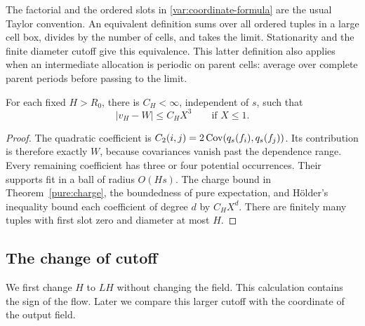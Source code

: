 The factorial and the ordered slots in
\eqref{var:coordinate-formula} are the usual Taylor convention.  An
equivalent definition sums over all ordered tuples in a large cell box,
divides by the number of cells, and takes the limit.  Stationarity and
the finite diameter cutoff give this equivalence.  This latter definition
also applies when an intermediate allocation is periodic on parent
cells: average over complete parent periods before passing to the limit.

\begin{lemma}\label{var:near-W}
For each fixed $H>R_0$, there is $C_H<\infty$, independent of $s$,
such that
\begin{equation}
 |v_H-W|\le C_H X^3\qquad\text{if }X\le1.
 \label{var:near-W-bound}
\end{equation}
\end{lemma}
\begin{proof}
The quadratic coefficient is
$C_2(i,j)=2\operatorname{Cov}(q_s(f_i),q_s(f_j))$.  Its contribution is therefore
exactly $W$, because covariances vanish past the dependence range.
Every remaining coefficient has three or four potential occurrences.
Their supports fit in a ball of radius $O(Hs)$.  The charge bound in
Theorem~\ref{pure:charge}, the boundedness of pure expectation, and
H\"older's inequality bound each coefficient of degree $d$ by
$C_H X^d$.  There are finitely many tuples with first slot zero and
diameter at most $H$.
\end{proof}

\subsection{The change of cutoff}

We first change $H$ to $LH$ without changing the field.  This calculation
contains the sign of the flow.  Later we compare this larger cutoff with
the coordinate of the output field.

